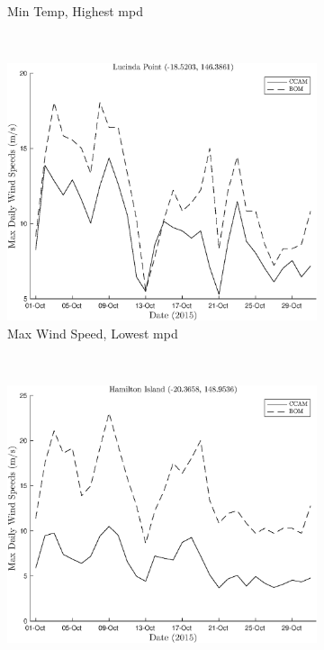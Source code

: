 \begin{figure}[!hbt]
\begin{subfigure}[b]{0.45\textwidth}
		\caption{Min Temp, Highest \gls{mpd}}
		\label{subfig:maxtmiddlepercy}
	\end{subfigure}
	\\
	\vspace{0.5cm}
    \begin{subfigure}[b]{0.45\textwidth}
        \includegraphics[width=\textwidth]{Fig/Research/BomComparison/MaxWind_vs_Time_Lucinda_Point.eps}
	    \caption{Max Wind Speed, Lowest \gls{mpd}}
	    \label{subfig:maxtluci}
    \end{subfigure}
	~~~
	\begin{subfigure}[b]{0.45\textwidth}
		\includegraphics[width=\textwidth]{Fig/Research/BomComparison/MaxWind_vs_Time_Hamilton_Island.eps}

\end{subfigure}
\end{figure}

